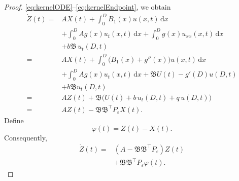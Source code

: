 \documentclass{IEEEtran}
\theoremstyle{definition}
\begin{document}
\begin{proof}
\eqref{eq:kernelODE}--\eqref{eq:kernelEndpoint}, we obtain
\begin{equation}
\begin{aligned}
\dot Z(t)={}&AX(t)+\int_0^D B_1(x)u(x,t)\,\mathrm dx\\
 &+\int_0^D Ag(x)u_t(x,t)\,\mathrm dx
  +\int_0^D g(x)u_{xx}(x,t)\,\mathrm dx\\
 &+b\mathfrak B\,u_t(D,t)\\
={}&AX(t)+\int_0^D\bigl(B_1(x)+g''(x)\bigr)u(x,t)\,\mathrm dx\\
 &+\int_0^D Ag(x)u_t(x,t)\,\mathrm dx
  +\mathfrak B U(t)-g'(D)u(D,t)\\
 &+b\mathfrak B u_t(D,t)\\
={}&AZ(t)+\mathfrak B\bigl(U(t)+b\,u_t(D,t)+q\,u(D,t)\bigr)\\
={}&AZ(t)-\mathfrak B\mathfrak B^\top P_\varepsilon X(t).
\end{aligned}
\label{eq:Zderivation}
\end{equation}
Define
\begin{equation}
 \varphi(t)=Z(t)-X(t).
\label{eq:phi_def}
\end{equation}
Consequently,
\begin{equation}
\begin{aligned}
\dot Z(t)={}&(A-\mathfrak B\mathfrak B^\top P_\varepsilon)Z(t)\\
 &+\mathfrak B\mathfrak B^\top P_\varepsilon\varphi(t).
\end{aligned}
\label{eq:Zdot2}
\end{equation}


\end{proof}
\end{document}
